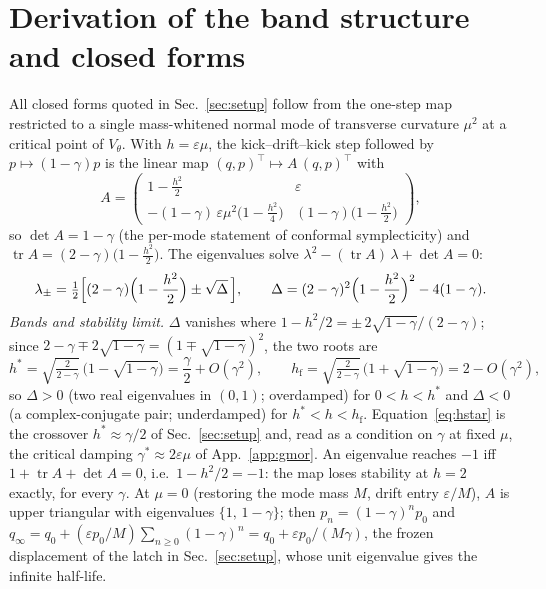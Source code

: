 \documentclass[mlabstract,onecolumn]{jmlr}
\begin{document}
\section{Derivation of the band structure and closed forms}\label{app:derivation}
All closed forms quoted in Sec.~\ref{sec:setup} follow from the one-step map restricted to a single mass-whitened normal mode of transverse curvature $\mu^2$ at a critical point of $V_\theta$. With $h=\varepsilon\mu$, the kick--drift--kick step followed by $p\mapsto(1-\gamma)p$ is the linear map $(q,p)^\top\mapsto A\,(q,p)^\top$ with
\begin{equation}\label{eq:block}
A=\begin{pmatrix}1-\frac{h^2}{2} & \varepsilon\\[2pt] -(1-\gamma)\,\varepsilon\mu^2\bigl(1-\frac{h^2}{4}\bigr) & (1-\gamma)\bigl(1-\frac{h^2}{2}\bigr)\end{pmatrix},
\end{equation}
so $\det A=1-\gamma$ (the per-mode statement of conformal symplecticity) and $\operatorname{tr}A=(2-\gamma)\bigl(1-\frac{h^2}{2}\bigr)$. The eigenvalues solve $\lambda^2-(\operatorname{tr}A)\,\lambda+\det A=0$:
\begin{equation}\label{eq:eigs}
\lambda_\pm=\tfrac12\Bigl[(2-\gamma)\Bigl(1-\frac{h^2}{2}\Bigr)\pm\sqrt{\Delta}\,\Bigr],
\qquad
\Delta=(2-\gamma)^2\Bigl(1-\frac{h^2}{2}\Bigr)^2-4(1-\gamma).
\end{equation}
\emph{Bands and stability limit.} $\Delta$ vanishes where $1-h^2/2=\pm\,2\sqrt{1-\gamma}/(2-\gamma)$; since $2-\gamma\mp2\sqrt{1-\gamma}=(1\mp\sqrt{1-\gamma})^2$, the two roots are
\begin{equation}\label{eq:hstar}
h^*=\sqrt{\tfrac{2}{2-\gamma}}\,\bigl(1-\sqrt{1-\gamma}\bigr)=\frac{\gamma}{2}+O(\gamma^2),
\qquad
h_{\mathrm f}=\sqrt{\tfrac{2}{2-\gamma}}\,\bigl(1+\sqrt{1-\gamma}\bigr)=2-O(\gamma^2),
\end{equation}
so $\Delta>0$ (two real eigenvalues in $(0,1)$; overdamped) for $0<h<h^*$ and $\Delta<0$ (a complex-conjugate pair; underdamped) for $h^*<h<h_{\mathrm f}$. Equation~\eqref{eq:hstar} is the crossover $h^*\approx\gamma/2$ of Sec.~\ref{sec:setup} and, read as a condition on $\gamma$ at fixed $\mu$, the critical damping $\gamma^*\approx2\varepsilon\mu$ of App.~\ref{app:gmor}. An eigenvalue reaches $-1$ iff $1+\operatorname{tr}A+\det A=0$, i.e.\ $1-h^2/2=-1$: the map loses stability at $h=2$ exactly, for every $\gamma$. At $\mu=0$ (restoring the mode mass $M$, drift entry $\varepsilon/M$), $A$ is upper triangular with eigenvalues $\{1,\,1-\gamma\}$; then $p_n=(1-\gamma)^n p_0$ and $q_\infty=q_0+(\varepsilon p_0/M)\sum_{n\ge0}(1-\gamma)^n=q_0+\varepsilon p_0/(M\gamma)$, the frozen displacement of the latch in Sec.~\ref{sec:setup}, whose unit eigenvalue gives the infinite half-life.
\end{document}
